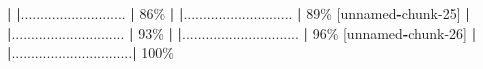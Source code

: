 \documentclass[
]{book}
\newenvironment{Shaded}{\begin{snugshade}}{\end{snugshade}}
\newcommand{\DecValTok}[1]{\textcolor[rgb]{0.00,0.00,0.81}{#1}}
\newcommand{\ErrorTok}[1]{\textcolor[rgb]{0.64,0.00,0.00}{\textbf{#1}}}
\newcommand{\NormalTok}[1]{#1}
\newcommand{\SpecialCharTok}[1]{\textcolor[rgb]{0.81,0.36,0.00}{\textbf{#1}}}
\begin{document}
\begin{Shaded}
\begin{Highlighting}[]
  \SpecialCharTok{|}                                     
  \ErrorTok{|}\NormalTok{...........................    }\SpecialCharTok{|}  \DecValTok{86}\NormalTok{\%                   }
  \SpecialCharTok{|}                                     
  \ErrorTok{|}\NormalTok{............................   }\SpecialCharTok{|}  \DecValTok{89}\NormalTok{\% [unnamed}\SpecialCharTok{{-}}\NormalTok{chunk}\DecValTok{{-}25}\NormalTok{]}
  \SpecialCharTok{|}                                     
  \ErrorTok{|}\NormalTok{.............................  }\SpecialCharTok{|}  \DecValTok{93}\NormalTok{\%                   }
  \SpecialCharTok{|}                                     
  \ErrorTok{|}\NormalTok{.............................. }\SpecialCharTok{|}  \DecValTok{96}\NormalTok{\% [unnamed}\SpecialCharTok{{-}}\NormalTok{chunk}\DecValTok{{-}26}\NormalTok{]}
  \SpecialCharTok{|}                                     
  \ErrorTok{|}\NormalTok{...............................}\SpecialCharTok{|} \DecValTok{100}\NormalTok{\%                   }

\end{Highlighting}
\end{Shaded}
\end{document}
